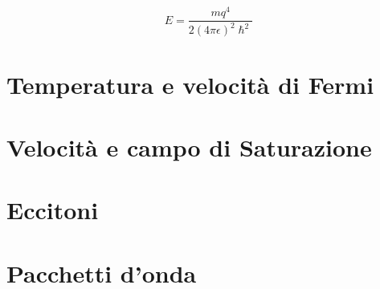 \documentclass[10pt,a4paper]{report}
\begin{document}
		\[
		E=\frac{mq^4}{2(4\pi \epsilon)^2 \hslash^2}
		\]

\chapter{Temperatura e velocità di Fermi}

\chapter{Velocità e campo di Saturazione}

\chapter{Eccitoni}

\chapter{Pacchetti d'onda}
\end{document}
